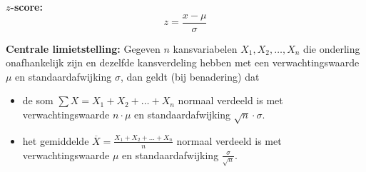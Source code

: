 \documentclass[11pt,a4paper,dutch]{article} %
\begin{document}
\textbf{$z$-score:}
\[
    z = \frac{x - \mu}{\sigma}
\]

\textbf{Centrale limietstelling:}
Gegeven $n$ kansvariabelen $X_1, X_2, \ldots, X_n$ die onderling onafhankelijk zijn en dezelfde kansverdeling hebben met een verwachtingswaarde $\mu$ en standaardafwijking $\sigma$, dan geldt (bij benadering) dat
\begin{itemize}
    \item de som $\sum X = X_1 + X_2 + \ldots + X_n$ normaal verdeeld is met verwachtingswaarde $n \cdot \mu$ en standaardafwijking $\sqrt{n} \cdot \sigma$.
    \item het gemiddelde $\overline{X} = \frac{X_1 + X_2 + \ldots + X_n}{n}$ normaal verdeeld is met verwachtingswaarde $\mu$ en standaardafwijking $\frac{\sigma}{\sqrt{n}}$.
\end{itemize}









\end{document}
